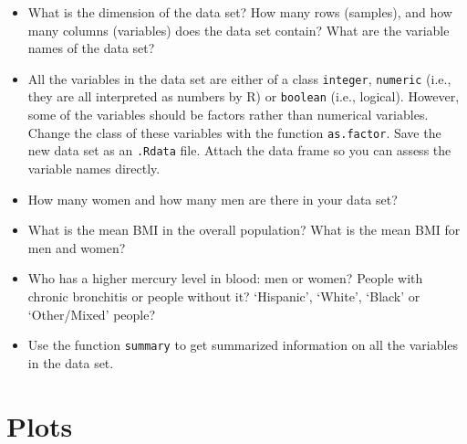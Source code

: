\documentclass[]{article}
\begin{document}
\begin{itemize}
\itemsep1pt\parskip0pt
\item
  What is the dimension of the data set? How many rows (samples), and
  how many columns (variables) does the data set contain? What are the
  variable names of the data set?\\
\item
  All the variables in the data set are either of a class
  \texttt{integer}, \texttt{numeric} (i.e., they are all interpreted as
  numbers by R) or \texttt{boolean} (i.e., logical). However, some of
  the variables should be factors rather than numerical variables.
  Change the class of these variables with the function
  \texttt{as.factor}. Save the new data set as an \texttt{.Rdata} file.
  Attach the data frame so you can assess the variable names directly.\\
\item
  How many women and how many men are there in your data set?\\
\item
  What is the mean BMI in the overall population? What is the mean BMI
  for men and women?\\
\item
  Who has a higher mercury level in blood: men or women? People with
  chronic bronchitis or people without it? `Hispanic', `White', `Black'
  or `Other/Mixed' people?\\
\item
  Use the function \texttt{summary} to get summarized information on all
  the variables in the data set.\\
\end{itemize}

\section{Plots}\label{plots}
\end{document}
